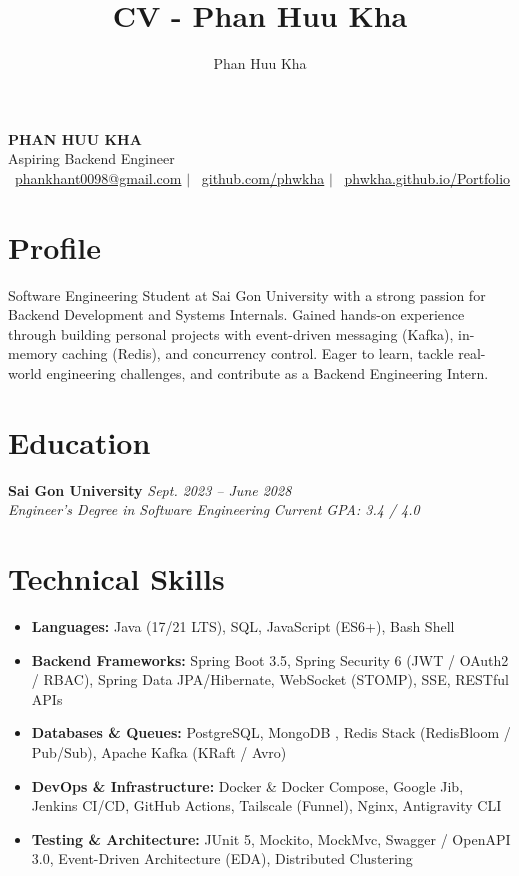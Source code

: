 \documentclass[a4paper,10pt]{article}
\title{CV - Phan Huu Kha}
\author{Phan Huu Kha}
\date{}
\begin{document}
\pagestyle{empty} %

\begin{center}
    {\huge \textbf{PHAN HUU KHA}} \\
    \vspace{3pt}
    {\large Aspiring Backend Engineer} \\
    \vspace{3pt}
    \faEnvelope\ \href{mailto:phankhant0098@gmail.com}{phankhant0098@gmail.com} $\vert$ 
    \faGithub\ \href{https://github.com/phwkha}{github.com/phwkha} $\vert$ 
    \faGlobe\ \href{https://phwkha.github.io/Portfolio/}{phwkha.github.io/Portfolio}
\end{center}

\section{Profile}
Software Engineering Student at Sai Gon University with a strong passion for Backend Development and Systems Internals. Gained hands-on experience through building personal projects with event-driven messaging (Kafka), in-memory caching (Redis), and concurrency control. Eager to learn, tackle real-world engineering challenges, and contribute as a Backend Engineering Intern.

\section{Education}
\vspace{2pt}
\textbf{Sai Gon University} \hfill \textit{Sept. 2023 -- June 2028} \\
\textit{Engineer's Degree in Software Engineering} \hfill \textit{Current GPA: 3.4 / 4.0}

\section{Technical Skills}
\vspace{2pt}
\begin{itemize}[leftmargin=0.15in, label={}, itemsep=1.5pt, topsep=2pt]
    \item \textbf{Languages:} Java (17/21 LTS), SQL, JavaScript (ES6+), Bash Shell
    \item \textbf{Backend Frameworks:} Spring Boot 3.5, Spring Security 6 (JWT / OAuth2 / RBAC), Spring Data JPA/Hibernate, WebSocket (STOMP), SSE, RESTful APIs
    \item \textbf{Databases \& Queues:} PostgreSQL, MongoDB , Redis Stack (RedisBloom / Pub/Sub), Apache Kafka (KRaft / Avro)
    \item \textbf{DevOps \& Infrastructure:} Docker \& Docker Compose, Google Jib, Jenkins CI/CD, GitHub Actions, Tailscale (Funnel), Nginx, Antigravity CLI
    \item \textbf{Testing \& Architecture:} JUnit 5, Mockito, MockMvc, Swagger / OpenAPI 3.0, Event-Driven Architecture (EDA), Distributed Clustering
\end{itemize}
\end{document}
